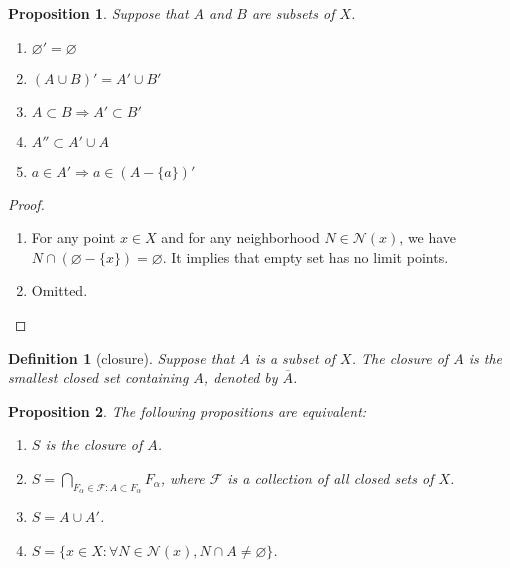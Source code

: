\documentclass{report}
\newtheorem{definition}{Definition}[section]
\newtheorem{proposition}{Proposition}[section]
\theoremstyle{nonumberplain}
\newtheorem{proof}{Proof.}
\begin{document}
\begin{proposition}
	Suppose that $A$ and $B$ are subsets of $X$.
	\begin{enumerate}
		\item $\varnothing'=\varnothing$
		\item $(A \cup B)'=A'\cup B' $
		\item $A \subset B \Longrightarrow A' \subset B'$
		\item $A'' \subset A' \cup A $
		\item $a \in A' \Longrightarrow a \in(A-\{a\})' $
	\end{enumerate}
\end{proposition}
\begin{proof}~\\ \vspace{-1em}
	\begin{enumerate}
		\item For any point $x\in X$ and for any neighborhood $N\in\mathcal{N}(x)$, we have $N\cap(\varnothing-\{x\})=\varnothing$. It implies that empty set has no limit points.
		\item Omitted.
	\end{enumerate}
\end{proof}

\begin{definition}[closure]
	Suppose that $A$ is a subset of $X$. The \emph{closure} of $A$ is the smallest closed set containing $A$, denoted by $\overline{A}$.
\end{definition}

\begin{proposition}
	The following propositions are equivalent:
	\begin{enumerate}
		\item $S$ is the closure of $A$.
		\item $S=\bigcap\limits_{F_\alpha\in\mathcal{F}:A\subset F_\alpha}F_\alpha$, where $\mathcal{F}$ is a collection of all closed sets of $X$.
		\item $S=A\cup A'$.
		\item $S=\{x\in X: \forall N\in\mathcal{N}(x),N\cap A\ne\varnothing\}$.
	\end{enumerate}
\end{proposition}
\end{document}
